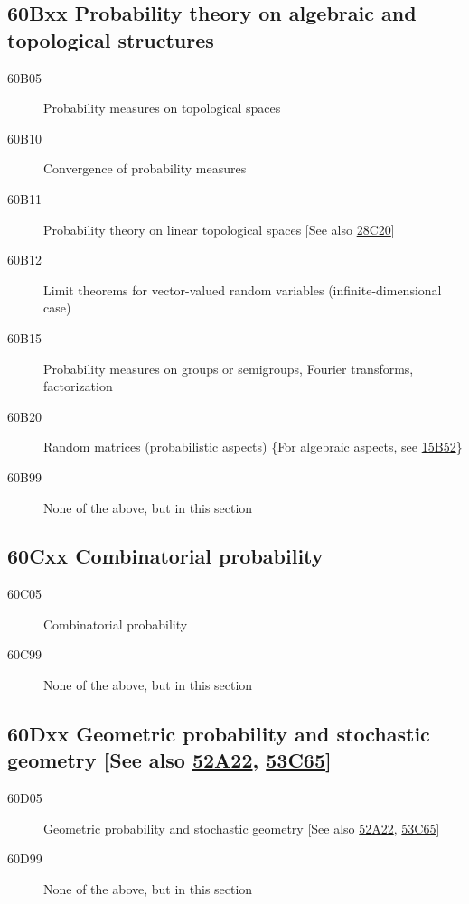\documentclass[letterpaper]{article}
\begin{document}
\subsection*{60Bxx  Probability theory on algebraic and topological structures }\label{60Bxx}
\begin{description}  
\item [60B05]\label{60B05} Probability measures on topological spaces
\item [60B10]\label{60B10} Convergence of probability measures
\item [60B11]\label{60B11} Probability theory on linear topological spaces [See also \hyperref[28C20]{28C20}]
\item [60B12]\label{60B12} Limit theorems for vector-valued random variables (infinite-dimensional case)
\item [60B15]\label{60B15} Probability measures on groups or semigroups, Fourier transforms, factorization
\item [60B20]\label{60B20} Random matrices (probabilistic aspects) \{For algebraic aspects, see \hyperref[15B52]{15B52}\}
\item [60B99]\label{60B99} None of the above, but in this section
\end{description}
\subsection*{60Cxx  Combinatorial probability }\label{60Cxx}
\begin{description}  
\item [60C05]\label{60C05} Combinatorial probability
\item [60C99]\label{60C99} None of the above, but in this section
\end{description}
\subsection*{60Dxx  Geometric probability and stochastic geometry [See also \hyperref[52A22]{52A22}, \hyperref[53C65]{53C65}] }\label{60Dxx}
\begin{description}  
\item [60D05]\label{60D05} Geometric probability and stochastic geometry [See also \hyperref[52A22]{52A22}, \hyperref[53C65]{53C65}]
\item [60D99]\label{60D99} None of the above, but in this section
\end{description}
\end{document}
